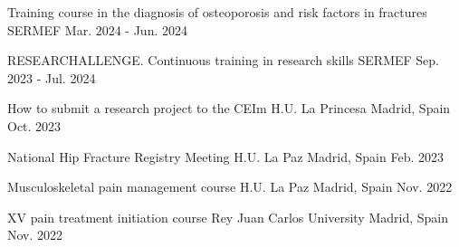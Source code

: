 \begin{cventries}
  \cventry
    {Training course in the diagnosis of osteoporosis and risk factors in fractures} %
    {SERMEF} %
    {} %
    {Mar. 2024 - Jun. 2024} %
    {}

  \cventry
    {RESEARCHALLENGE. Continuous training in research skills} %
    {SERMEF} %
    {} %
    {Sep. 2023 - Jul. 2024} %
    {}

  \cventry
    {How to submit a research project to the CEIm} %
    {H.U. La Princesa} %
    {Madrid, Spain} %
    {Oct. 2023} %
    {}

  \cventry
    {National Hip Fracture Registry Meeting} %
    {H.U. La Paz} %
    {Madrid, Spain} %
    {Feb. 2023} %
    {}

  \cventry
    {Musculoskeletal pain management course} %
    {H.U. La Paz} %
    {Madrid, Spain} %
    {Nov. 2022} %
    {}

  \cventry
    {XV pain treatment initiation course} %
    {Rey Juan Carlos University} %
    {Madrid, Spain} %
    {Nov. 2022} %
    {}

\end{cventries}
